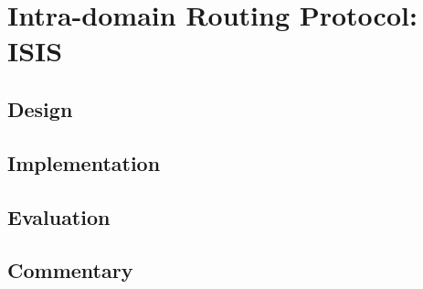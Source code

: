 \section{Intra-domain Routing Protocol: ISIS}
\label{sec:isis}

\subsection{Design}

\subsection{Implementation}

\subsection{Evaluation}

\subsection{Commentary}



